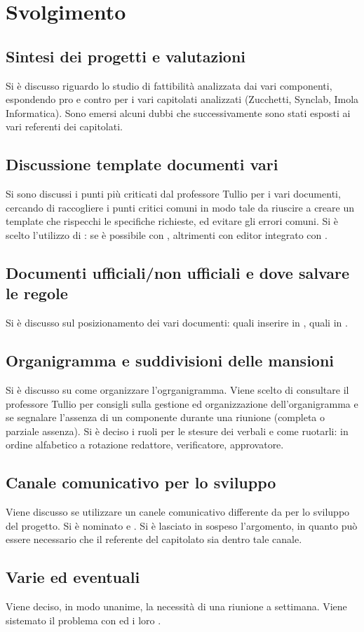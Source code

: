 \newpage
\section*{Svolgimento}

	\subsection*{Sintesi dei progetti e valutazioni}
		Si è discusso riguardo lo studio di fattibilità analizzata dai vari componenti, espondendo pro e contro per i vari capitolati analizzati (Zucchetti, Synclab, Imola Informatica). Sono emersi alcuni dubbi che successivamente sono stati esposti ai vari referenti dei capitolati.

	\subsection*{Discussione template documenti vari}
		Si sono discussi i punti più criticati dal professore Tullio per i vari documenti, cercando di raccogliere i punti critici comuni in modo tale da riuscire a creare un template che rispecchi le specifiche richieste, ed evitare gli errori comuni. Si è scelto l'utilizzo di \glock{\LaTeX}: se è possibile con , altrimenti con editor \glock{\LaTeX} integrato con .

	\subsection*{Documenti ufficiali/non ufficiali e dove salvare le regole}
		Si è discusso sul posizionamento dei vari documenti: quali inserire in , quali in .
		
	\subsection*{Organigramma e suddivisioni delle mansioni}
		Si è discusso su come organizzare l'ogrganigramma. Viene scelto di consultare il professore Tullio per consigli sulla gestione ed organizzazione dell'organigramma e se segnalare l'assenza di un componente durante una riunione (completa o parziale assenza). Si è deciso i ruoli per le stesure dei verbali e come ruotarli: in ordine alfabetico a rotazione redattore, verificatore, approvatore.
	
	\subsection*{Canale comunicativo per lo sviluppo}
		Viene discusso se utilizzare un canele comunicativo differente da  per lo sviluppo del progetto. Si è nominato  e . Si è lasciato in sospeso l'argomento, in quanto può essere necessario che il referente del capitolato sia dentro tale canale.
		
	\subsection*{Varie ed eventuali}
		Viene deciso, in modo unanime, la necessità di una riunione a settimana.
		Viene sistemato il problema con  ed i loro .